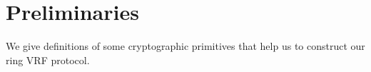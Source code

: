 \newcommand{\com}{\mathsf{Com}}
\newcommand{\open}{\mathsf{Open}}
\newcommand{\commit}{\mathsf{Commit}}
\section{Preliminaries} %
\label{sec:background}

We   give definitions of some cryptographic primitives that help us to construct our ring VRF protocol.




